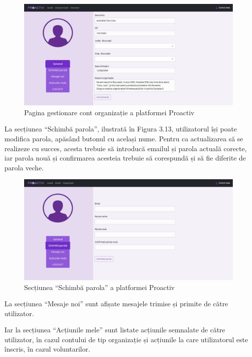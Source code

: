 \documentclass[12pt,a4paper]{report}
\begin{document}
\begin{figure}[H]
\centering
  \includegraphics[width=1\linewidth]{./imagini/cont1org.jpg}
  \caption{Pagina gestionare cont organizație a platformei Proactiv}
\end{figure}
\par
La secțiunea “Schimbă parola”, ilustrată în Figura 3.13, utilizatorul își poate modifica parola, apăsând butonul cu același nume. Pentru ca actualizarea să se realizeze cu succes, acesta trebuie să introducă emailul și parola actuală corecte, iar parola nouă și confirmarea acesteia trebuie să corespundă și să fie diferite de parola veche.
\\
\begin{figure}[H]
\centering
  \includegraphics[width=1\linewidth]{./imagini/cont2.jpg}
  \caption{Secțiunea “Schimbă parola” a platformei Proactiv}
\end{figure}
\par
La secțiunea “Mesaje noi” sunt afișate mesajele trimise și primite de către utilizator.
\\\par
Iar la secțiunea “Acțiunile mele” sunt listate acțiunile semnalate de către utilizator, în cazul contului de tip organizație și acțiunile la care utilizatorul este înscris, în cazul voluntarilor.
\end{document}
